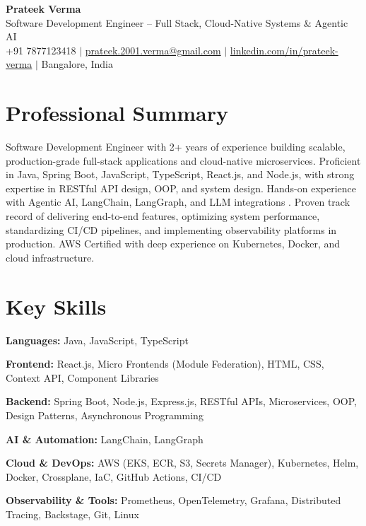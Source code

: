 \documentclass[letterpaper,10.5pt]{article}
\begin{document}
\begin{center}
  {\LARGE \textbf{Prateek Verma}} \\[4pt]
  \small Software Development Engineer -- Full Stack, Cloud-Native Systems \& Agentic AI \\[4pt]
  +91 7877123418 \;$|$\;
  \href{mailto:prateek.2001.verma@gmail.com}{prateek.2001.verma@gmail.com} \;$|$\;
  \href{https://linkedin.com/in/prateek-verma}{linkedin.com/in/prateek-verma} \;$|$\;
  Bangalore, India
\end{center}

\section{Professional Summary}
\small{
Software Development Engineer with 2+ years of experience building scalable, production-grade full-stack applications and cloud-native microservices. Proficient in Java, Spring Boot, JavaScript, TypeScript, React.js, and Node.js, with strong expertise in RESTful API design, OOP, and system design. Hands-on experience with Agentic AI, LangChain, LangGraph, and LLM integrations . Proven track record of delivering end-to-end features, optimizing system performance, standardizing CI/CD pipelines, and implementing observability platforms in production. AWS Certified with deep experience on Kubernetes, Docker, and cloud infrastructure.
}

\section{Key Skills}
\begin{itemize}[leftmargin=0.15in, label={}, itemsep=-1pt]
  \small{
    \item \textbf{Languages:} Java, JavaScript, TypeScript
    \item \textbf{Frontend:} React.js, Micro Frontends (Module Federation), HTML, CSS,  Context API, Component Libraries
    \item \textbf{Backend:} Spring Boot, Node.js, Express.js, RESTful APIs, Microservices, OOP, Design Patterns, Asynchronous Programming
    \item \textbf{AI \& Automation:} LangChain, LangGraph
    \item \textbf{Cloud \& DevOps:} AWS (EKS, ECR, S3, Secrets Manager), Kubernetes, Helm, Docker, Crossplane, IaC, GitHub Actions, CI/CD
    \item \textbf{Observability \& Tools:} Prometheus, OpenTelemetry, Grafana, Distributed Tracing, Backstage, Git, Linux
  }
\end{itemize}
\end{document}
